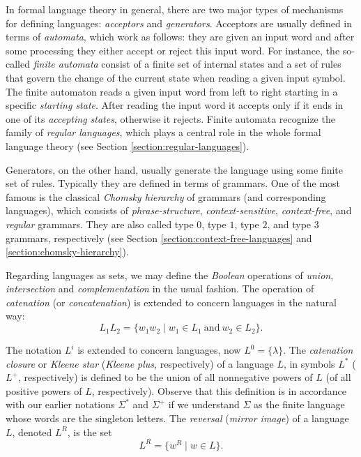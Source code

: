 In formal language theory in general, there are two major types of mechanisms for defining languages: \emph{acceptors} and \emph{generators}. Acceptors are usually defined in terms of \emph{automata}, which work as follows: they are given an input word and after some processing they either accept or reject this input word. For instance, the so-called \emph{finite automata} consist of a finite set of internal states and a set of rules that govern the change of the current state when reading a given input symbol. The finite automaton reads a given input word from left to right starting in a specific \emph{starting state}. After reading the input word it accepts only if it ends in one of its \emph{accepting states}, otherwise it rejects. Finite automata recognize the family of \emph{regular languages}, which plays a central role in the whole formal language theory (see Section \ref{section:regular-languages}).

Generators, on the other hand, usually generate the language using some finite set of rules. Typically they are defined in terms of grammars. One of the most famous is the classical \emph{Chomsky hierarchy} of grammars (and corresponding languages), which consists of \emph{phrase-structure}, \emph{context-sensitive}, \emph{context-free}, and \emph{regular} grammars. They are also called type $0$, type $1$, type $2$, and type $3$ grammars, respectively (see Section \ref{section:context-free-languages} and \ref{section:chomsky-hierarchy}).

Regarding languages as sets, we may define the \emph{Boolean} operations of \emph{union}, \emph{intersection} and \emph{complementation} in the usual fashion. The operation of \emph{catenation} (or \emph{concatenation}) is extended to concern languages in the natural way:
$$L_1 L_2 = \{w_1 w_2 \mid w_1 \in L_1 \ \text{and} \ w_2 \in L_2\}.$$

The notation $L^i$ is extended to concern languages, now $L^0 = \{\lambda\}$. The \emph{catenation closure} or  \emph{Kleene star} (\emph{Kleene plus}, respectively) of a language $L$, in symbols $L^*$ ($L^+$, respectively) is defined to be the union of all nonnegative powers of $L$ (of all positive powers of $L$, respectively). Observe that this definition is in accordance with our earlier notations $\Sigma^*$ and $\Sigma^+$ if we understand $\Sigma$ as the finite language whose words are the singleton letters. The \emph{reversal} (\emph{mirror image}) of a language $L$, denoted $L^R$, is the set
$$L^R = \{w^R \mid w \in L\}.$$

